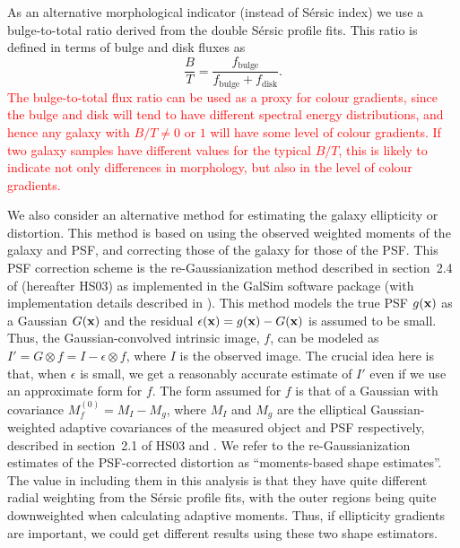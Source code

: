 \documentclass[twocolumn,useAMS,usenatbib]{mn2e}
\newcommand{\rachel}[1]{{\textcolor{red}{#1}}}
\newcommand{\sersic}{S\'{e}rsic }
\begin{document}
As an alternative morphological indicator (instead of \sersic index)
we use a bulge-to-total ratio derived from the double \sersic
profile fits.  This ratio is defined in terms of bulge and disk fluxes as
\begin{equation}
\frac{B}{T} = \frac{f_\text{bulge}}{f_\text{bulge}+f_\text{disk}}.
\end{equation}
\rachel{The bulge-to-total flux ratio can be used as a proxy for
  colour gradients, since the bulge and disk will tend to have
  different spectral energy distributions, and hence any galaxy with
  $B/T\ne 0$ or $1$ will have some level of colour gradients.  If two
  galaxy samples have different values for the typical $B/T$, this is
  likely to indicate not only differences in morphology, but also in
  the level of colour gradients.}
 
We also consider an alternative method for estimating the galaxy
ellipticity or distortion.  This method is based on using the observed weighted
moments of the galaxy and PSF, and correcting those of the galaxy for
those of the PSF.  This PSF correction scheme is the
re-Gaussianization method described in section~2.4 of \cite{HS03}
(hereafter HS03) as implemented in the {\sc GalSim} software package
(with implementation details described in \citealt{2014arXiv1407.7676R}).
This method models the true PSF $g({\bf x})$ as a Gaussian $G({\bf x})$ and the residual $\epsilon({\bf x}) = g({\bf x}) - G({\bf x})$ is assumed to be small. Thus, the Gaussian-convolved
intrinsic image, $f$, can be modeled as $I' = G\otimes f = I - \epsilon \otimes f$, where $I$ is the observed image. The crucial idea here is that, when $\epsilon$ is small, we get a reasonably accurate
estimate of $I'$ even if we use an approximate form for $f$. The form
assumed for $f$ is that of a Gaussian with covariance $M_f^{(0)} = M_I
- M_g$, where $M_I$ and $M_g$ are the elliptical Gaussian-weighted adaptive
covariances of the measured object and PSF respectively, described in
section~2.1 of HS03 and \cite{BJ02}. We refer to the
re-Gaussianization estimates of the PSF-corrected distortion as
``moments-based shape estimates''.  The value in including them in
this analysis is that they have quite different radial weighting from
the \sersic profile fits, with the outer regions being quite
downweighted when calculating adaptive moments.  Thus, if ellipticity
gradients are important, we could get different results using these
two shape estimators.
\end{document}

